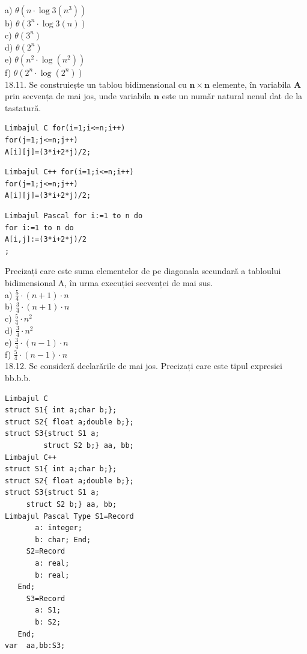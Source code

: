 {{\\
a) $\theta\left(n \cdot \log 3\left(n^{3}\right)\right)$
\\
b) $\theta\left(3^{n} \cdot \log 3(n)\right)$
\\
c) $\theta\left(3^{n}\right)$
\\
d) $\theta\left(2^{n}\right)$
\\
e) $\theta\left(n^{2} \cdot \log \left(n^{2}\right)\right)$
\\
f) $\theta\left(2^{n} \cdot \log \left(2^{n}\right)\right)$
\\
18.11. Se construiește un tablou bidimensional cu $\mathbf{n} \times \mathbf{n}$ elemente, în variabila $\mathbf{A}$ prin secvența de mai jos, unde variabila $\mathbf{n}$ este un număr natural nenul dat de la tastatură.
\begin{verbatim}
Limbajul C for(i=1;i<=n;i++) 
for(j=1;j<=n;j++) 
A[i][j]=(3*i+2*j)/2;
\end{verbatim}
\begin{verbatim}
Limbajul C++ for(i=1;i<=n;i++) 
for(j=1;j<=n;j++) 
A[i][j]=(3*i+2*j)/2;
\end{verbatim}
\begin{verbatim}
Limbajul Pascal for i:=1 to n do 
for i:=1 to n do 
A[i,j]:=(3*i+2*j)/2
;
\end{verbatim}
Precizați care este suma elementelor de pe diagonala secundară a tabloului bidimensional A, în urma execuției secvenței de mai sus.
\\
a) $\frac{5}{4} \cdot(n+1) \cdot n$
\\
b) $\frac{3}{4} \cdot(n+1) \cdot n$
\\
c) $\frac{5}{4} \cdot n^{2}$
\\
d) $\frac{3}{4} \cdot n^{2}$
\\
e) $\frac{3}{4} \cdot(n-1) \cdot n$
\\
f) $\frac{5}{4} \cdot(n-1) \cdot n$
\\
18.12. Se consideră declarările de mai jos. Precizați care este tipul expresiei bb.b.b.
\begin{verbatim}
Limbajul C 
struct S1{ int a;char b;}; 
struct S2{ float a;double b;}; 
struct S3{struct S1 a; 
         struct S2 b;} aa, bb;
Limbajul C++ 
struct S1{ int a;char b;}; 
struct S2{ float a;double b;}; 
struct S3{struct S1 a; 
     struct S2 b;} aa, bb;
Limbajul Pascal Type S1=Record 
       a: integer; 
       b: char; End; 
     S2=Record 
       a: real; 
       b: real;  
   End; 
     S3=Record 
       a: S1; 
       b: S2; 
   End; 
var  aa,bb:S3; 
\end{verbatim}
}}
